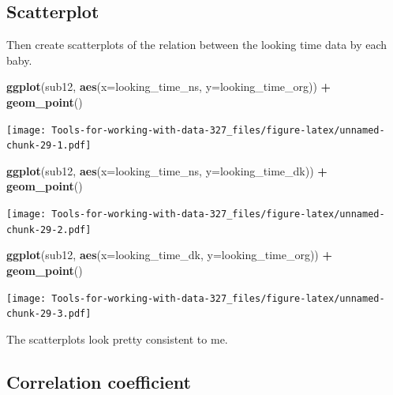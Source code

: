 \documentclass[
]{book}
\newenvironment{Shaded}{\begin{snugshade}}{\end{snugshade}}
\newcommand{\DataTypeTok}[1]{\textcolor[rgb]{0.13,0.29,0.53}{#1}}
\newcommand{\KeywordTok}[1]{\textcolor[rgb]{0.13,0.29,0.53}{\textbf{#1}}}
\newcommand{\NormalTok}[1]{#1}
\newcommand{\OperatorTok}[1]{\textcolor[rgb]{0.81,0.36,0.00}{\textbf{#1}}}
\newcommand{\StringTok}[1]{\textcolor[rgb]{0.31,0.60,0.02}{#1}}
\begin{document}
\hypertarget{scatterplot-1}{%
\subsection{Scatterplot}\label{scatterplot-1}}

Then create scatterplots of the relation between the looking time data by each baby.

\begin{Shaded}
\begin{Highlighting}[]
\KeywordTok{ggplot}\NormalTok{(sub12, }\KeywordTok{aes}\NormalTok{(}\DataTypeTok{x=}\NormalTok{looking_time_ns, }\DataTypeTok{y=}\NormalTok{looking_time_org)) }\OperatorTok{+}
\StringTok{  }\KeywordTok{geom_point}\NormalTok{()}
\end{Highlighting}
\end{Shaded}

\texttt{[image: Tools-for-working-with-data-327\_files/figure-latex/unnamed-chunk-29-1.pdf]}

\begin{Shaded}
\begin{Highlighting}[]
\KeywordTok{ggplot}\NormalTok{(sub12, }\KeywordTok{aes}\NormalTok{(}\DataTypeTok{x=}\NormalTok{looking_time_ns, }\DataTypeTok{y=}\NormalTok{looking_time_dk)) }\OperatorTok{+}
\StringTok{  }\KeywordTok{geom_point}\NormalTok{()}
\end{Highlighting}
\end{Shaded}

\texttt{[image: Tools-for-working-with-data-327\_files/figure-latex/unnamed-chunk-29-2.pdf]}

\begin{Shaded}
\begin{Highlighting}[]
\KeywordTok{ggplot}\NormalTok{(sub12, }\KeywordTok{aes}\NormalTok{(}\DataTypeTok{x=}\NormalTok{looking_time_dk, }\DataTypeTok{y=}\NormalTok{looking_time_org)) }\OperatorTok{+}
\StringTok{  }\KeywordTok{geom_point}\NormalTok{()}
\end{Highlighting}
\end{Shaded}

\texttt{[image: Tools-for-working-with-data-327\_files/figure-latex/unnamed-chunk-29-3.pdf]}

The scatterplots look pretty consistent to me.

\hypertarget{correlation-coefficient-1}{%
\subsection{Correlation coefficient}\label{correlation-coefficient-1}}
\end{document}
